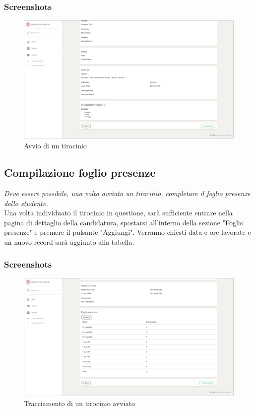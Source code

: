\subsubsection{Screenshots}
\begin{figure}[H]
	\centering
	\includegraphics[width=1\textwidth]{Chapter3/Figs/screenshots/internshipproposalstart}     
	\caption[Screenshot: avvio di un tirocinio]{Avvio di un tirocinio}
	\label{fig:screenshot:7}
\end{figure}

\pagebreak
\subsection{Compilazione foglio presenze}\label{sec:compilazione-foglio-presenze}

\textit{Deve essere possibile, una volta avviato un tirocinio, completare il foglio presenze dello studente.} \\

\noindent
Una volta individuato il tirocinio in questione, sarà sufficiente entrare nella pagina di dettaglio della candidatura, spostarsi all'interno della sezione "Foglio presenze" e premere il pulsante "Aggiungi". Verranno chiesti data e ore lavorate e un nuovo record sarà aggiunto alla tabella.

\subsubsection{Screenshots}
\begin{figure}[H]
	\centering
	\includegraphics[width=1\textwidth]{Chapter3/Figs/screenshots/internshiptrack}     
	\caption[Screenshot: tracciamento di un tirocinio avviato]{Tracciamento di un tirocinio avviato}
	\label{fig:screenshot:8}
\end{figure}

